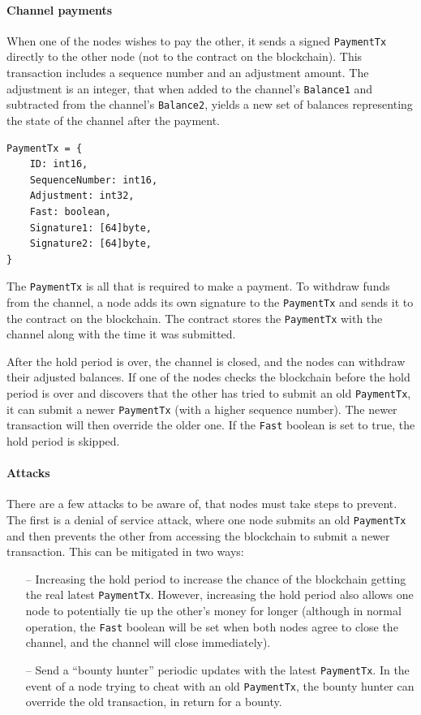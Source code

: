 \documentclass[11pt]{article}
\begin{document}
\paragraph{Channel payments}
When one of the nodes wishes to pay the other, it sends a signed \texttt{PaymentTx} directly to the other node (not to the contract on the blockchain). This transaction includes a sequence number and an adjustment amount. The adjustment is an integer, that when added to the channel’s \texttt{Balance1} and subtracted from the channel’s \texttt{Balance2}, yields a new set of balances representing the state of the channel after the payment.

\begin{minipage}[c]{\textwidth}
\begin{lstlisting}
PaymentTx = {
	ID: int16,
	SequenceNumber: int16,
	Adjustment: int32,
	Fast: boolean,
	Signature1: [64]byte,
	Signature2: [64]byte,
}
\end{lstlisting}
\end{minipage}

The \texttt{PaymentTx} is all that is required to make a payment. To withdraw funds from the channel, a node adds its own signature to the \texttt{PaymentTx} and sends it to the contract on the blockchain. The contract stores the \texttt{PaymentTx} with the channel along with the time it was submitted.

After the hold period is over, the channel is closed, and the nodes can withdraw their adjusted balances. If one of the nodes checks the blockchain before the hold period is over and discovers that the other has tried to submit an old \texttt{PaymentTx}, it can submit a newer \texttt{PaymentTx} (with a higher sequence number). The newer transaction will then override the older one. If the \texttt{Fast} boolean is set to true, the hold period is skipped.
 
\paragraph{Attacks}
There are a few attacks to be aware of, that nodes must take steps to prevent. The first is a denial of service attack, where one node submits an old \texttt{PaymentTx} and then prevents the other from accessing the blockchain to submit a newer transaction. This can be mitigated in two ways:

\begin{itemize}
\item[--] Increasing the hold period to increase the chance of the blockchain getting the real latest \texttt{PaymentTx}. However, increasing the hold period also allows one node to potentially tie up the other’s money for longer (although in normal operation, the \texttt{Fast} boolean will be set when both nodes agree to close the channel, and the channel will close immediately).
 
\item[--] Send a ``bounty hunter'' periodic updates with the latest \texttt{PaymentTx}. In the event of a node trying to cheat with an old \texttt{PaymentTx}, the bounty hunter can override the old transaction, in return for a bounty.
\end{itemize} 
\end{document}
